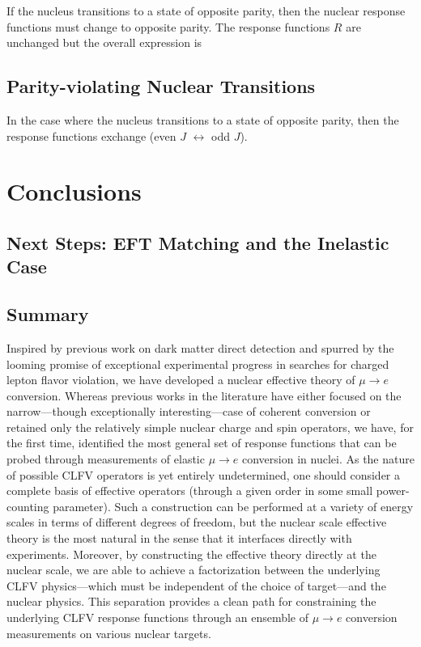 \documentclass{book}[letterpaper,12pt]
\begin{document}
If the nucleus transitions to a state of opposite parity, then the nuclear response functions must change to opposite parity. The response functions $R$ are unchanged but the overall expression is
\section{Parity-violating Nuclear Transitions}
In the case where the nucleus transitions to a state of opposite parity, then the response functions exchange (even $J$ $\leftrightarrow$ odd $J$).

\chapter{Conclusions}
\label{chap:conclusion}
\thispagestyle{headings}
\section{Next Steps: EFT Matching and the Inelastic Case}
\section{Summary}
Inspired by previous work on dark matter direct detection and spurred by the looming promise of exceptional experimental progress in searches for charged lepton flavor violation, we have developed a nuclear effective theory of $\mu\rightarrow e$ conversion. Whereas previous works in the literature have either focused on the narrow---though exceptionally interesting---case of coherent conversion or retained only the relatively simple nuclear charge and spin operators, we have, for the first time, identified the most general set of response functions that can be probed through measurements of elastic $\mu\rightarrow e$ conversion in nuclei. As the nature of possible CLFV operators is yet entirely undetermined, one should consider a complete basis of effective operators (through a given order in some small power-counting parameter). Such a construction can be performed at a variety of energy scales in terms of different degrees of freedom, but the nuclear scale effective theory is the most natural in the sense that it interfaces directly with experiments. Moreover, by constructing the effective theory directly at the nuclear scale, we are able to achieve a factorization between the underlying CLFV physics---which must be independent of the choice of target---and the nuclear physics. This separation provides a clean path for constraining the underlying CLFV response functions through an ensemble of $\mu\rightarrow e$ conversion measurements on various nuclear targets. 
\end{document}

